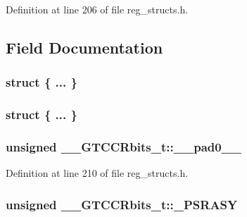 Definition at line 206 of file reg\+\_\+structs.\+h.



\subsection{Field Documentation}
\hypertarget{union_____g_t_c_c_rbits__t_adadd4ab107501d717ae35f9d860515a9}{\subsubsection[{"@47}]{\setlength{\rightskip}{0pt plus 5cm}struct \{ ... \} }}\label{union_____g_t_c_c_rbits__t_adadd4ab107501d717ae35f9d860515a9}
\hypertarget{union_____g_t_c_c_rbits__t_ae5574b22e00acb9687dc9a90a684ba3c}{\subsubsection[{"@49}]{\setlength{\rightskip}{0pt plus 5cm}struct \{ ... \} }}\label{union_____g_t_c_c_rbits__t_ae5574b22e00acb9687dc9a90a684ba3c}
\hypertarget{union_____g_t_c_c_rbits__t_a18c8fc8915465c26a306637d50f8c179}{
\subsubsection[{\+\_\+\+\_\+pad0\+\_\+\+\_\+}]{\setlength{\rightskip}{0pt plus 5cm}unsigned \+\_\+\+\_\+\+G\+T\+C\+C\+Rbits\+\_\+t\+::\+\_\+\+\_\+pad0\+\_\+\+\_\+}}\label{union_____g_t_c_c_rbits__t_a18c8fc8915465c26a306637d50f8c179}


Definition at line 210 of file reg\+\_\+structs.\+h.

\hypertarget{union_____g_t_c_c_rbits__t_ad6264c8b5fd3980a98b458aaf2e4f195}{
\subsubsection[{\+\_\+\+P\+S\+R\+A\+S\+Y}]{\setlength{\rightskip}{0pt plus 5cm}unsigned \+\_\+\+\_\+\+G\+T\+C\+C\+Rbits\+\_\+t\+::\+\_\+\+P\+S\+R\+A\+S\+Y}}\label{union_____g_t_c_c_rbits__t_ad6264c8b5fd3980a98b458aaf2e4f195}


